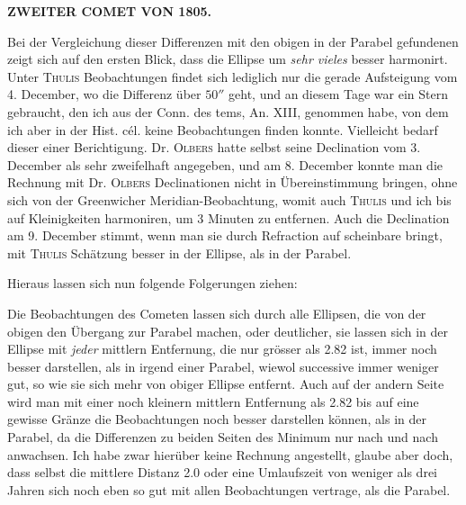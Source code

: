 \par\clearpage
\thispagestyle{empty}
\noindent{}%
\makebox[12mm][l]{}%
\parbox[t]{\dimexpr\linewidth-24mm\relax}{\centering\footnotesize\bfseries ZWEITER COMET VON 1805.\par}%
\par\nobreak\medskip
\par\indent Bei der Vergleichung dieser Differenzen mit den obigen in der Parabel gefundenen
zeigt sich auf den ersten Blick, dass die Ellipse um \emph{sehr vieles} besser
harmonirt. Unter \textsc{Thulis} Beobachtungen findet sich lediglich nur die
gerade Aufsteigung vom 4. December, wo die Differenz über $50''$ geht, und an
diesem Tage war ein Stern gebraucht, den ich aus der Conn. des tems, An. XIII,
genommen habe, von dem ich aber in der Hist. cél. keine Beobachtungen finden
konnte. Vielleicht bedarf dieser einer Berichtigung. Dr. \textsc{Olbers} hatte
selbst seine Declination vom 3. December als sehr zweifelhaft angegeben, und am
8. December konnte man die Rechnung mit Dr. \textsc{Olbers} Declinationen nicht
in Übereinstimmung bringen, ohne sich von der Greenwicher Meridian-Beobachtung,
womit auch \textsc{Thulis} und ich bis auf Kleinigkeiten harmoniren, um 3
Minuten zu entfernen. Auch die Declination am 9. December stimmt, wenn man sie
durch Refraction auf scheinbare bringt, mit \textsc{Thulis} Schätzung besser in
der Ellipse, als in der Parabel.

\par\indent Hieraus lassen sich nun folgende Folgerungen ziehen:

\par\indent Die Beobachtungen des Cometen lassen sich durch alle Ellipsen, die von der
obigen den Übergang zur Parabel machen, oder deutlicher, sie lassen sich in der
Ellipse mit \emph{jeder} mittlern Entfernung, die nur grösser als 2.82 ist,
immer noch besser darstellen, als in irgend einer Parabel, wiewol successive
immer weniger gut, so wie sie sich mehr von obiger Ellipse entfernt. Auch auf
der andern Seite wird man mit einer noch kleinern mittlern Entfernung als 2.82
bis auf eine gewisse Gränze die Beobachtungen noch besser darstellen können,
als in der Parabel, da die Differenzen zu beiden Seiten des Minimum nur nach
und nach anwachsen. Ich habe zwar hierüber keine Rechnung angestellt, glaube
aber doch, dass selbst die mittlere Distanz 2.0 oder eine Umlaufszeit von
weniger als drei Jahren sich noch eben so gut mit allen Beobachtungen
vertrage, als die Parabel.

